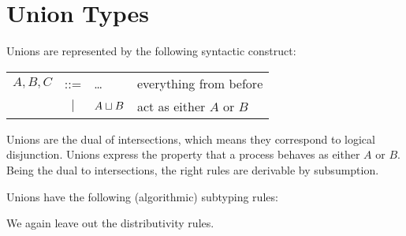 
\section{Union Types}

Unions are represented by the following syntactic construct:
\begin{center}
\begin{tabular}{l c l l}
  $A, B, C$ & ::= & \ldots                & everything from before \\
            & $|$   & $A \mathbin{\sqcup} B$        & act as either $A$ or $B$
\end{tabular}
\end{center}

Unions are the dual of intersections, which means they correspond to logical disjunction. Unions express the property that a process behaves as either $A$ or $B.$ Being the dual to intersections, the right rules are derivable by subsumption.


Unions have the following (algorithmic) subtyping rules:

We again leave out the distributivity rules.

